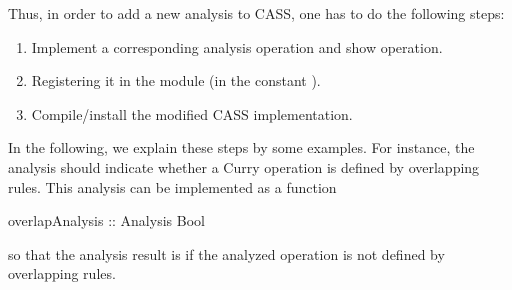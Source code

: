 Thus, in order to add a new analysis to CASS, one has to do the following
steps:
\begin{enumerate}
\item
Implement a corresponding analysis operation and show operation.
\item
Registering it in the module 
(in the constant ).
\item
Compile/install the modified CASS implementation.
\end{enumerate}
In the following, we explain these steps by some examples.
%
For instance, the  analysis should indicate
whether a Curry operation is defined by overlapping rules.
This analysis can be implemented as a function
\begin{curry}
overlapAnalysis :: Analysis Bool
\end{curry}
so that the analysis result is  if the analyzed
operation is not defined by overlapping rules.

